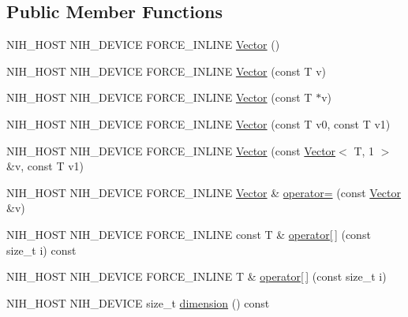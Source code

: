 \subsection*{\-Public \-Member \-Functions}
\begin{DoxyCompactItemize}
\item 
\-N\-I\-H\-\_\-\-H\-O\-S\-T \-N\-I\-H\-\_\-\-D\-E\-V\-I\-C\-E \-F\-O\-R\-C\-E\-\_\-\-I\-N\-L\-I\-N\-E \hyperlink{structnih_1_1_vector_3_01_t_00_012_01_4_a0d14da0f64ea711e804cad90fcc14859}{\-Vector} ()
\item 
\-N\-I\-H\-\_\-\-H\-O\-S\-T \-N\-I\-H\-\_\-\-D\-E\-V\-I\-C\-E \-F\-O\-R\-C\-E\-\_\-\-I\-N\-L\-I\-N\-E \hyperlink{structnih_1_1_vector_3_01_t_00_012_01_4_a690d778950f807362930a6731d053031}{\-Vector} (const \-T v)
\item 
\-N\-I\-H\-\_\-\-H\-O\-S\-T \-N\-I\-H\-\_\-\-D\-E\-V\-I\-C\-E \-F\-O\-R\-C\-E\-\_\-\-I\-N\-L\-I\-N\-E \hyperlink{structnih_1_1_vector_3_01_t_00_012_01_4_a6c3a470babc04a06c4e7cae7817fc9c1}{\-Vector} (const \-T $\ast$v)
\item 
\-N\-I\-H\-\_\-\-H\-O\-S\-T \-N\-I\-H\-\_\-\-D\-E\-V\-I\-C\-E \-F\-O\-R\-C\-E\-\_\-\-I\-N\-L\-I\-N\-E \hyperlink{structnih_1_1_vector_3_01_t_00_012_01_4_a583d88096e3a36c4fe55c996a73124f9}{\-Vector} (const \-T v0, const \-T v1)
\item 
\-N\-I\-H\-\_\-\-H\-O\-S\-T \-N\-I\-H\-\_\-\-D\-E\-V\-I\-C\-E \-F\-O\-R\-C\-E\-\_\-\-I\-N\-L\-I\-N\-E \hyperlink{structnih_1_1_vector_3_01_t_00_012_01_4_a6faa6aad92bdedf1d965cea57d9c27a9}{\-Vector} (const \hyperlink{structnih_1_1_vector}{\-Vector}$<$ \-T, 1 $>$ \&v, const \-T v1)
\item 
\-N\-I\-H\-\_\-\-H\-O\-S\-T \-N\-I\-H\-\_\-\-D\-E\-V\-I\-C\-E \*
\-F\-O\-R\-C\-E\-\_\-\-I\-N\-L\-I\-N\-E \hyperlink{structnih_1_1_vector}{\-Vector} \& \hyperlink{structnih_1_1_vector_3_01_t_00_012_01_4_a5642e3babae06f1cde5779ecb97b918f}{operator=} (const \hyperlink{structnih_1_1_vector}{\-Vector} \&v)
\item 
\-N\-I\-H\-\_\-\-H\-O\-S\-T \-N\-I\-H\-\_\-\-D\-E\-V\-I\-C\-E \*
\-F\-O\-R\-C\-E\-\_\-\-I\-N\-L\-I\-N\-E const \-T \& \hyperlink{structnih_1_1_vector_3_01_t_00_012_01_4_aa494f7aa68630cbd253c5f950ea4e976}{operator\mbox{[}$\,$\mbox{]}} (const size\-\_\-t i) const 
\item 
\-N\-I\-H\-\_\-\-H\-O\-S\-T \-N\-I\-H\-\_\-\-D\-E\-V\-I\-C\-E \*
\-F\-O\-R\-C\-E\-\_\-\-I\-N\-L\-I\-N\-E \-T \& \hyperlink{structnih_1_1_vector_3_01_t_00_012_01_4_adec475bd0cddb664605c692867b76bd8}{operator\mbox{[}$\,$\mbox{]}} (const size\-\_\-t i)
\item 
\-N\-I\-H\-\_\-\-H\-O\-S\-T \-N\-I\-H\-\_\-\-D\-E\-V\-I\-C\-E size\-\_\-t \hyperlink{structnih_1_1_vector_3_01_t_00_012_01_4_a054b3ba0ffc424c497deb234fe6a7c7a}{dimension} () const 
\end{DoxyCompactItemize}
